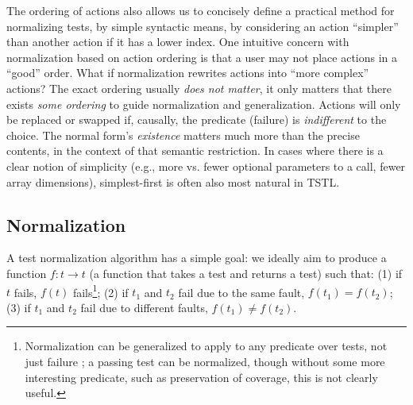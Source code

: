 The ordering of actions also allows us to concisely define a
practical method for normalizing tests, by
simple syntactic means, by considering an action ``simpler'' than another
action if it has a lower index.  One intuitive concern with normalization
based on action ordering is that a user may not place actions
in a ``good'' order.  What if normalization
rewrites actions into ``more complex'' actions?
The exact ordering usually \emph{does not matter}, it only
matters that there exists \emph{some ordering} to guide normalization
and generalization.  Actions will only be replaced or swapped if,
causally, the predicate (failure) is \emph{indifferent} to the choice.  The
normal form's \emph{existence} matters much more than the precise contents, in
the context of that semantic restriction.  In cases where there is a
clear notion of simplicity (e.g., more vs. fewer optional parameters
to a call, fewer array dimensions), simplest-first is often
also most natural in TSTL.

\subsection{Normalization}

A test normalization algorithm has a simple goal:  we ideally aim to
produce a function $f : t \rightarrow t$ (a function that takes a test
and returns a test) such that: (1) if $t$ fails, $f(t)$ fails\footnote{Normalization can
    be generalized to apply to any predicate over tests, not just
    failure \cite{icst2014}; a passing test can be normalized, though
    without some more interesting predicate, such as preservation of
    coverage, this is not clearly useful.}; (2) if $t_1$ and $t_2$ fail
  due to the same fault, $f(t_1) = f(t_2)$; (3) if $t_1$ and $t_2$ fail due to different faults, $f(t_1) \not=
  f(t_2)$.

\begin{comment}
\begin{enumerate}
\item If $t$ fails, $f(t)$ fails\footnote{Normalization can
    be generalized to apply to any predicate over tests, not just
    failure \cite{icst2014}.}.
\item If $t_1$ and $t_2$ fail due to the same fault, $f(t_1) = f(t_2)$.
\item If $t_1$ and $t_2$ fail due to different faults, $f(t_1) \not=
  f(t_2)$.
\end{enumerate}
\end{comment}

